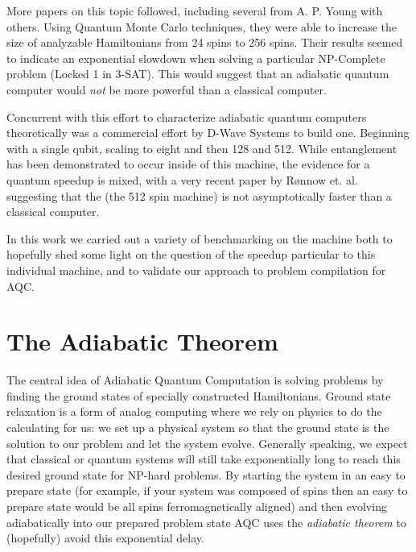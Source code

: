 More papers on this topic followed, including several from A. P. Young with others.\cite{young3}\cite{young2}\cite{young1}  Using Quantum Monte Carlo techniques, they were able to increase the size of analyzable Hamiltonians from 24 spins to 256 spins.\cite{young1}
Their results seemed to indicate an exponential slowdown when solving a particular NP-Complete problem (Locked 1 in 3-SAT).\cite{young2}  This would suggest that an adiabatic quantum computer would \emph{not} be more powerful than a classical computer.

Concurrent with this effort to characterize adiabatic quantum computers theoretically was a commercial effort by D-Wave Systems to build one.  Beginning with a single qubit\cite{qubit}, scaling to eight\cite{PhysRevB.82.024511} and then 128\cite{boixo2} and 512.\cite{pudenz}  While entanglement has been demonstrated to occur inside of this machine\cite{lanting}, the evidence for a quantum speedup is mixed,\cite{pudenz}\cite{boixo}\cite{smolin} with a very recent paper by R{\o}nnow et. al. suggesting that the \machine (the 512 spin machine) is not asymptotically faster than a classical computer.\cite{speedup}

In this work we carried out a variety of benchmarking on the \machine machine both to hopefully shed some light on the question of the speedup particular to this individual machine, and to validate our approach to problem compilation for AQC.

\section{The Adiabatic Theorem}

The central idea of Adiabatic Quantum Computation is solving problems by finding the ground states of specially constructed Hamiltonians.\cite{farhi}  Ground state relaxation is a form of analog computing where we rely on physics to do the calculating for us: we set up a physical system so that the ground state is the solution to our problem and let the system evolve.  Generally speaking, we expect that classical or quantum systems will still take exponentially long to reach this desired ground state for NP-hard problems.\cite{aaronson}
By starting the system in an easy to prepare state (for example, if your system was composed of spins then an easy to prepare state would be all spins ferromagnetically aligned) and then evolving adiabatically into our prepared problem state AQC uses the \emph{adiabatic theorem} to (hopefully) avoid this exponential delay.

